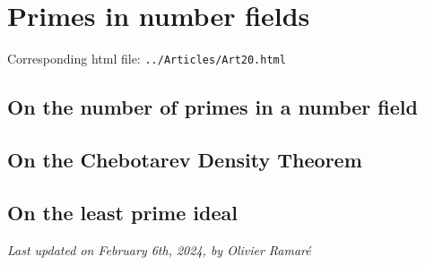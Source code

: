 \chapter{  Primes in number fields}

Corresponding html file: \texttt{../Articles/Art20.html}










 
 


\section{On the number of primes in a number field}


\section{On the Chebotarev Density Theorem}


\section{On the least prime ideal}








  
\begin{flushright}\small\sl{}   Last updated on February 6th, 2024, by Olivier Ramar\'e
 \end{flushright}














